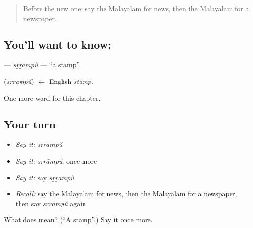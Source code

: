 \begin{quote}
Before the new one: say the Malayalam for news, then the Malayalam for a newspaper.
\end{quote}

\subsection*{You'll want to know: }
\textbf{} — \emph{sṟṟāmpŭ} — \textquotedblleft{}a stamp\textquotedblright{}.

\begin{cousinweb}
\textbf{} (\emph{sṟṟāmpŭ}) $\leftarrow$ English \emph{stamp}.
\end{cousinweb}

\begin{grammarlens}[title={What you've built}]
One more word for this chapter.
\end{grammarlens}

\subsection*{Your turn}
\begin{itemize}
\raggedright
  \item \emph{Say it:} \emph{sṟṟāmpŭ}
  \item \emph{Say it:} \emph{sṟṟāmpŭ}, once more
  \item \emph{Say it:} say \emph{sṟṟāmpŭ}
  \item \emph{Recall:} say the Malayalam for news, then the Malayalam for a newspaper, then say \emph{sṟṟāmpŭ} again
\end{itemize}

\begin{tcolorbox}[breakable,colback=teal!4,colframe=teal!35!black,title={Before you move on}]
What does  mean? (\textquotedblleft{}A stamp\textquotedblright{}.) Say it once more.
\end{tcolorbox}
